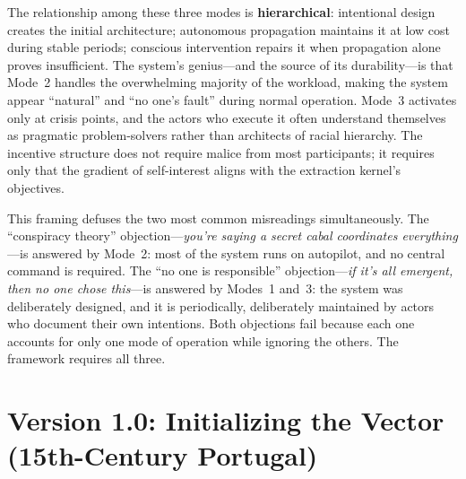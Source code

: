 \documentclass[12pt,openany]{book}
\begin{document}
The relationship among these three modes is \textbf{hierarchical}: intentional design creates the initial architecture; autonomous propagation maintains it at low cost during stable periods; conscious intervention repairs it when propagation alone proves insufficient. The system's genius---and the source of its durability---is that Mode~2 handles the overwhelming majority of the workload, making the system appear ``natural'' and ``no one's fault'' during normal operation. Mode~3 activates only at crisis points, and the actors who execute it often understand themselves as pragmatic problem-solvers rather than architects of racial hierarchy. The incentive structure does not require malice from most participants; it requires only that the gradient of self-interest aligns with the extraction kernel's objectives.

This framing defuses the two most common misreadings simultaneously. The ``conspiracy theory'' objection---\textit{you're saying a secret cabal coordinates everything}---is answered by Mode~2: most of the system runs on autopilot, and no central command is required. The ``no one is responsible'' objection---\textit{if it's all emergent, then no one chose this}---is answered by Modes~1 and~3: the system was deliberately designed, and it is periodically, deliberately maintained by actors who document their own intentions. Both objections fail because each one accounts for only one mode of operation while ignoring the others. The framework requires all three.

\chapter{Version 1.0: Initializing the Vector (15th-Century Portugal)}
\label{ch:portugal}
\end{document}
